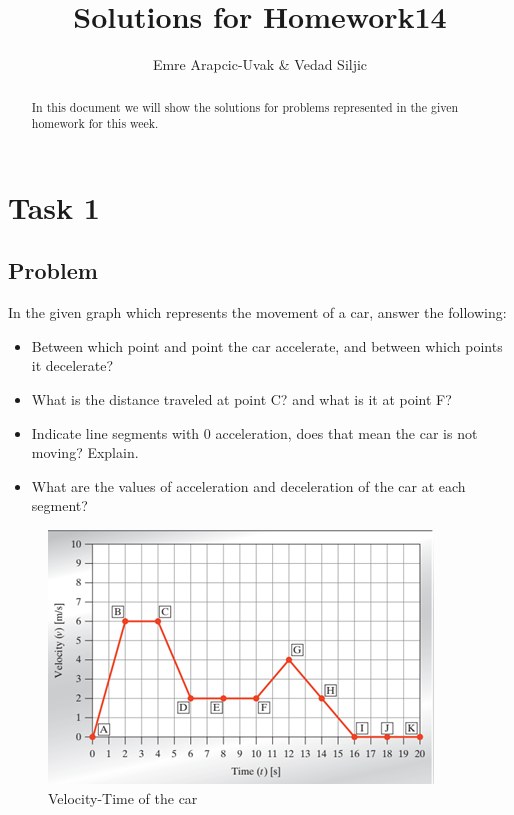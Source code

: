 \documentclass[a4paper, 10pt]{article}
\title{Solutions for Homework14}
\author{Emre Arapcic-Uvak & Vedad Siljic}
\date{}
\begin{document}
	\maketitle
	\vspace{5mm}
	
	\begin{abstract}
		\begin{center}
			\noindent In this document we will show the solutions for problems represented in the given homework for this week.
		\end{center}
	\end{abstract}
	\pagebreak
	
	\tableofcontents
	\pagebreak
	
	\section{Task 1}
	
		\subsection{Problem}
			\noindent In the given graph which represents the movement of a car, answer the following:
			\begin{itemize}
				\item Between which point and point the car accelerate, and between which points it decelerate?
				\item What is the distance traveled at point C? and what is it at point F?
				\item Indicate line segments with 0 acceleration, does that mean the car is not moving? Explain.
				\item What are the values of acceleration and deceleration of the car at each segment?
			\end{itemize}	
		
			\begin{figure}[h]
				\centering
				\includegraphics{Task1CarVelocityTimeGraph}
				\caption{Velocity-Time of the car}
				\label{fig:task1Fig}
			\end{figure}
\end{document}

